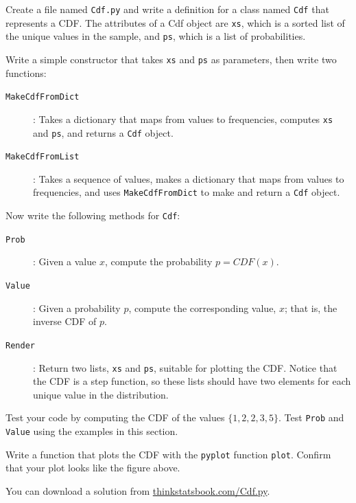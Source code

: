 \documentclass[12pt]{book}
\begin{document}
\begin{ex}
Create a file named {\tt Cdf.py} and write a definition for a class
named {\tt Cdf} that represents a CDF.  The attributes of a Cdf
object are {\tt xs}, which is a sorted list of the unique values
in the sample, and {\tt ps}, which is a list of probabilities.

Write a simple constructor that takes {\tt xs} and {\tt ps} as
parameters, then write two functions:

\begin{description}

\item[{\tt MakeCdfFromDict}]: Takes a dictionary that maps from
values to frequencies, computes {\tt xs} and {\tt ps}, and returns
a {\tt Cdf} object.

\item[{\tt MakeCdfFromList}]: Takes a sequence of values, makes
a dictionary that maps from values to frequencies, and uses
{\tt MakeCdfFromDict} to make and return a {\tt Cdf} object.

\end{description}

Now write the following methods for {\tt Cdf}:

\begin{description}

\item[{\tt Prob}]: Given a value $x$, compute the probability $p = CDF(x)$.

\item[{\tt Value}]: Given a probability $p$, compute the
corresponding value, $x$; that is, the inverse CDF of $p$.

\item[{\tt Render}]: Return two lists, {\tt xs} and {\tt ps}, suitable
for plotting the CDF.  Notice that the CDF is a step function, so these
lists should have two elements for each unique value in the distribution.

\end{description}

Test your code by computing the CDF of the values $\{1, 2, 2, 3, 5\}$.
Test {\tt Prob} and {\tt Value} using the examples in this section.

Write a function that plots the CDF with the {\tt pyplot} function
{\tt plot}.  Confirm that your plot looks like the figure above.

You can download a solution from \url{thinkstatsbook.com/Cdf.py}.
\end{ex}
\end{document}
